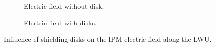 \begin{figure}[!ht]
	\centering
	\begin{subfigure}[t]{0.7\textwidth}
		
		\caption[Electric field without disk]{Electric field without disk.}
		\label{chap3:no_disk}
	\end{subfigure}

	\begin{subfigure}[t]{0.7\textwidth}
		\centering
		
		\caption[Electric field with disks]{Electric field with disks.}
		\label{chap3:disks}
	\end{subfigure}
	\caption[Influence of shielding disks on the IPM electric field]{Influence of shielding disks on the IPM electric field along the LWU.}
	\label{chap3:IPM_disk}
\end{figure}

